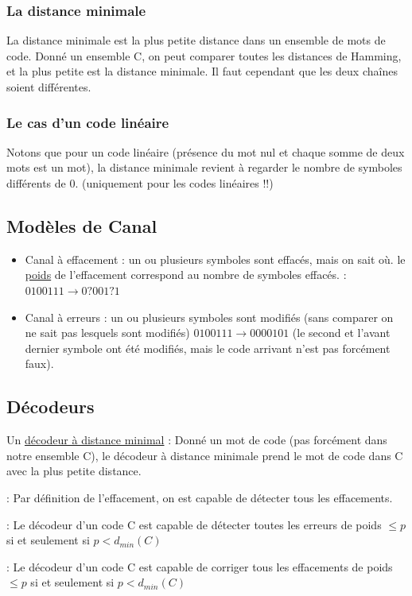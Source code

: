 \documentclass[11pt,a4paper]{article}
\renewcommand{\)}{\right)}
\renewcommand{\(}{\left(}
\begin{document}
\subsubsection{La distance minimale}
La distance minimale est la plus petite distance dans un ensemble de mots de code. Donné un ensemble C, on peut comparer toutes les distances de Hamming, et la plus petite est la distance minimale. Il faut cependant que les deux chaînes soient différentes. 
\subsubsection{Le cas d'un code linéaire}
Notons que pour un code linéaire (présence du mot nul et chaque somme de deux mots est un mot), la distance minimale revient à regarder le nombre de symboles différents de 0. (uniquement pour les codes linéaires !!)
\subsection{Modèles de Canal}
\begin{itemize}
	\item Canal à effacement : un ou plusieurs symboles sont effacés, mais on sait où. le \uline{poids} de l'effacement correspond au nombre de symboles effacés. : $0100111 \to 0?001?1$
	\item Canal à erreurs : un ou plusieurs symboles sont modifiés (sans comparer on ne sait pas lesquels sont modifiés) $0100111 \to 0000101$ (le second et l'avant dernier symbole ont été modifiés, mais le code arrivant n'est pas forcément faux).
\end{itemize}
\subsection{Décodeurs}
\label{canaux}
Un \uline{décodeur à distance minimal} : Donné un mot de code (pas forcément dans notre ensemble C), le décodeur à distance minimale prend le mot de code dans C avec la plus petite distance.

 : Par définition de l'effacement, on est capable de détecter tous les effacements.

 : Le décodeur d'un code C est capable de détecter toutes les erreurs de poids $\leq p$ si et seulement si $p < d_{min}(C)$ 

 : Le décodeur d'un code C est capable de corriger tous les effacements de poids $\leq p$ si et seulement si $p < d_{min}(C)$ 
\end{document}
